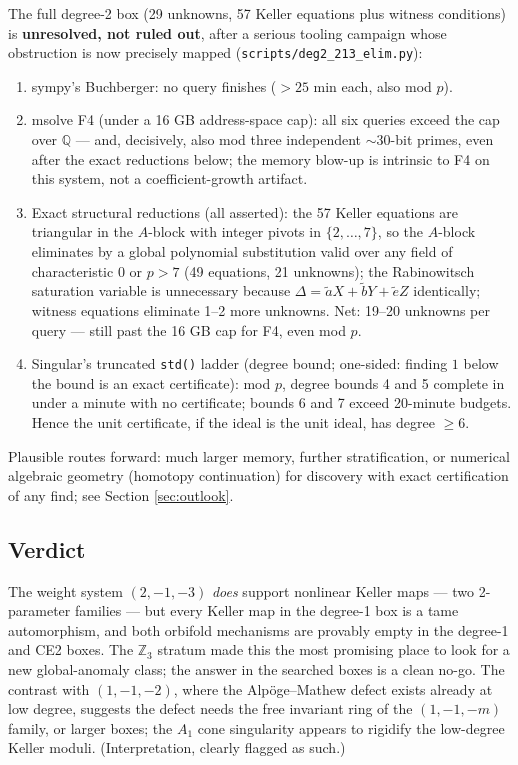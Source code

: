 \documentclass[11pt]{article}
\theoremstyle{definition}
\theoremstyle{remark}
\newcommand{\Q}{\mathbb{Q}}
\newcommand{\Z}{\mathbb{Z}}
\begin{document}
The full degree-2 box (29 unknowns, 57 Keller equations plus witness
conditions) is \textbf{unresolved, not ruled out}, after a serious
tooling campaign whose obstruction is now precisely mapped
(\texttt{scripts/deg2\_213\_elim.py}):
\begin{enumerate}
\item sympy's Buchberger: no query finishes ($>25$ min each, also mod
 $p$).
\item msolve F4 \cite{msolve} (under a 16 GB address-space cap): all six
 queries exceed the cap over $\Q$ --- and, decisively, also mod three
 independent $\sim$30-bit primes, even after the exact reductions
 below; the memory blow-up is intrinsic to F4 on this system, not a
 coefficient-growth artifact.
\item Exact structural reductions (all asserted): the 57 Keller
 equations are triangular in the $A$-block with integer pivots in
 $\{2,\dots,7\}$, so the $A$-block eliminates by a global polynomial
 substitution valid over any field of characteristic $0$ or $p > 7$
 (49 equations, 21 unknowns); the Rabinowitsch saturation variable is
 unnecessary because $\Delta = \tilde aX + \tilde bY + \tilde eZ$
 identically; witness equations eliminate 1--2 more unknowns. Net:
 19--20 unknowns per query --- still past the 16 GB cap for F4, even
 mod $p$.
\item Singular's truncated \texttt{std()} ladder \cite{Singular}
 (degree bound; one-sided: finding $1$ below the bound is an exact
 certificate): mod $p$, degree bounds 4 and 5 complete in under a
 minute with no certificate; bounds 6 and 7 exceed 20-minute budgets.
 Hence the unit certificate, if the ideal is the unit ideal, has
 degree $\ge 6$.
\end{enumerate}
Plausible routes forward: much larger memory, further stratification,
or numerical algebraic geometry (homotopy continuation) for discovery
with exact certification of any find; see Section \ref{sec:outlook}.

\subsection{Verdict}

The weight system $(2,-1,-3)$ \emph{does} support nonlinear Keller maps
--- two 2-parameter families --- but every Keller map in the degree-1 box
is a tame automorphism, and both orbifold mechanisms are provably empty
in the degree-1 and CE2 boxes. The $\Z_3$ stratum made this the most
promising place to look for a new global-anomaly class; the answer in
the searched boxes is a clean no-go. The contrast with $(1,-1,-2)$,
where the Alp\"oge--Mathew defect exists already at low degree, suggests
the defect needs the free invariant ring of the $(1,-1,-m)$ family, or
larger boxes; the $A_1$ cone singularity appears to rigidify the
low-degree Keller moduli. (Interpretation, clearly flagged as such.)
\end{document}
